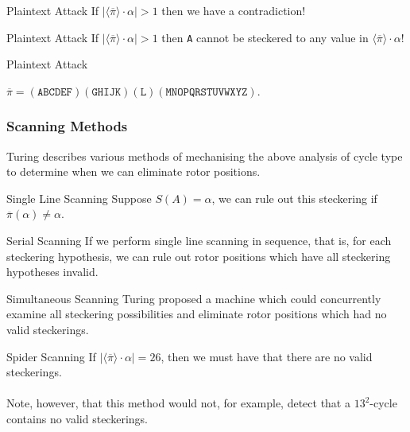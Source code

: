 \documentclass[hyphens,aspectratio=169]{beamer}
\begin{document}
\begin{frame}[fragile]{Plaintext Attack}
	\large
	If $|\langle\overline{\pi}\rangle\cdot \alpha| > 1$ then we have a contradiction!
\end{frame}

\begin{frame}[fragile]{Plaintext Attack}
	\large
	If $|\langle\overline{\pi}\rangle\cdot \alpha| > 1$ then \texttt{A} cannot be steckered to any value in $\langle\overline{\pi}\rangle\cdot \alpha$!
\end{frame}

\begin{frame}[fragile]{Plaintext Attack}
\large
	\begin{center}
		$\overline\pi =
			(\texttt{ABCDEF})(\texttt{GHIJK})(\texttt{L})(\texttt{MNOPQRSTUVWXYZ})$.
	\end{center}
\end{frame}

\begin{frame}
	\frametitle{Scanning Methods
	}
	\large
	Turing describes various methods of mechanising the above analysis of cycle type to determine when we can eliminate rotor positions.
\end{frame}

\begin{frame}{Single Line Scanning}
	Suppose $S(A) = \alpha$, we can rule out this steckering if $\overline\pi(\alpha
		) \ne \alpha$.
\end{frame}

\begin{frame}{Serial Scanning}
	If we perform single line scanning in sequence, that is, for each steckering hypothesis, we can rule out rotor positions which have all steckering hypotheses invalid.
\end{frame}

\begin{frame}{Simultaneous Scanning}
	Turing proposed a machine which could concurrently examine all steckering possibilities and eliminate rotor positions
	which had no valid steckerings.

\end{frame}

\begin{frame}{Spider Scanning}
	If $|\langle\overline\pi\rangle\cdot\alpha| = 26$, then we must have that there are no valid steckerings.
	\\\\Note, however, that this method
	would not, for example, detect that a $13^{2}$-cycle contains no valid steckerings.
\end{frame}
\end{document}
